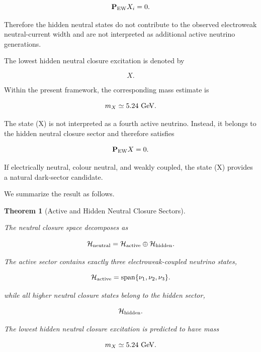 \documentclass[11pt]{article}
\newtheorem{theorem}{Theorem}[section]
\theoremstyle{definition}
\theoremstyle{remark}
\begin{document}
\begin{equation}
\mathbf P_{\rm EW}X_i = 0.
\label{eq:hidden_projection}
\end{equation}

Therefore the hidden neutral states do not contribute to the
observed electroweak neutral-current width and are not
interpreted as additional active neutrino generations.

The lowest hidden neutral closure excitation is denoted by

\begin{equation}
X.
\end{equation}

Within the present framework, the corresponding mass estimate
is

\begin{equation}
m_X
\simeq
5.24~{\rm GeV}.
\label{eq:mx_prediction}
\end{equation}

The state (X) is not interpreted as a fourth active neutrino.
Instead, it belongs to the hidden neutral closure sector and
therefore satisfies

\begin{equation}
\mathbf P_{\rm EW}X =
0.
\end{equation}

If electrically neutral, colour neutral, and weakly coupled,
the state (X) provides a natural dark-sector candidate.

We summarize the result as follows.

\begin{theorem}[Active and Hidden Neutral Closure Sectors]
\label{thm:active_hidden_neutral}

The neutral closure space decomposes as

\begin{equation}
\mathcal H_{\rm neutral} = 
\mathcal H_{\rm active}
\oplus
\mathcal H_{\rm hidden}.
\end{equation}

The active sector contains exactly three electroweak-coupled
neutrino states,

\begin{equation}
\mathcal H_{\rm active}
=
\operatorname{span}
\{\nu_1,\nu_2,\nu_3\}.
\end{equation}

while all higher neutral closure states belong to the hidden
sector,

\begin{equation}
\mathcal H_{\rm hidden}.
\end{equation}

The lowest hidden neutral closure excitation is predicted to
have mass

\begin{equation}
m_X
\simeq
5.24~{\rm GeV}.
\end{equation}

\end{theorem}
\end{document}
